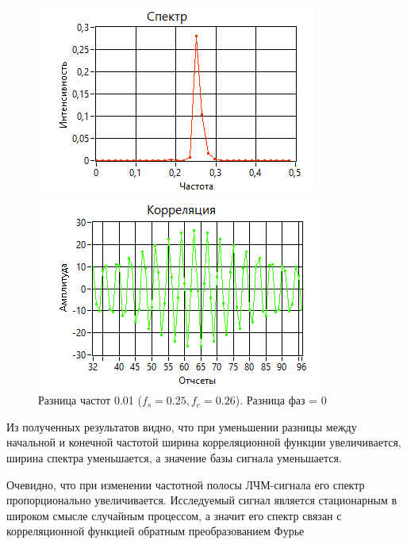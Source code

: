 \begin{figure}[H]
    \centering
    \begin{minipage}{0.49\linewidth}
        \includegraphics[width =0.9\linewidth]{imgs/spec4.png}
    \end{minipage}
    \begin{minipage}{0.49\linewidth}
        \includegraphics[width =0.9\linewidth]{imgs/corr4.png}
    \end{minipage}
	\caption{Разница частот 0.01 ($f_{s}=0.25, f_{e}=0.26$). Разница фаз = 0}
	\label{fig:spec4}
\end{figure}

Из полученных результатов видно, что при уменьшении разницы между начальной
и конечной частотой ширина корреляционной функции увеличивается, ширина спектра уменьшается,
а значение базы сигнала уменьшается.

Очевидно, что при  изменении частотной полосы ЛЧМ-сигнала его спектр
пропорционально увеличивается. Исследуемый сигнал является стационарным в
широком смысле случайным процессом, а значит его спектр связан с корреляционной
функцией обратным преобразованием Фурье


